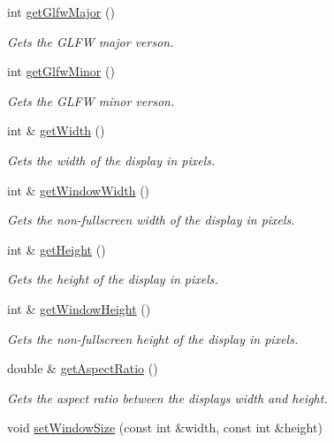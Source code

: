 \begin{DoxyCompactItemize}
int \hyperlink{classflounder_1_1display_a5e6a9e9ea60e2f8d0850ea689abb0569}{get\+Glfw\+Major} ()
\begin{DoxyCompactList}\small\item\em Gets the G\+L\+FW major verson. \end{DoxyCompactList}\item 
int \hyperlink{classflounder_1_1display_ac6fbd123308dce6a0d8f281a9ea55b37}{get\+Glfw\+Minor} ()
\begin{DoxyCompactList}\small\item\em Gets the G\+L\+FW minor verson. \end{DoxyCompactList}\item 
int \& \hyperlink{classflounder_1_1display_ac2b45bb8c8924b985895f2b08c03c3d9}{get\+Width} ()
\begin{DoxyCompactList}\small\item\em Gets the width of the display in pixels. \end{DoxyCompactList}\item 
int \& \hyperlink{classflounder_1_1display_ac47027c6b34d260ccaf148e4e762cdbe}{get\+Window\+Width} ()
\begin{DoxyCompactList}\small\item\em Gets the non-\/fullscreen width of the display in pixels. \end{DoxyCompactList}\item 
int \& \hyperlink{classflounder_1_1display_a2b3cea6e41121de9d790acf027036167}{get\+Height} ()
\begin{DoxyCompactList}\small\item\em Gets the height of the display in pixels. \end{DoxyCompactList}\item 
int \& \hyperlink{classflounder_1_1display_af1d306cb8353a7cdfe7daae4727028fc}{get\+Window\+Height} ()
\begin{DoxyCompactList}\small\item\em Gets the non-\/fullscreen height of the display in pixels. \end{DoxyCompactList}\item 
double \& \hyperlink{classflounder_1_1display_a7b32aeb7809ad48663ce6eb4596b37a3}{get\+Aspect\+Ratio} ()
\begin{DoxyCompactList}\small\item\em Gets the aspect ratio between the displays width and height. \end{DoxyCompactList}\item 
void \hyperlink{classflounder_1_1display_a13edcfe35505b3e164010ed1b232e5d1}{set\+Window\+Size} (const int \&width, const int \&height)

\end{DoxyCompactItemize}
